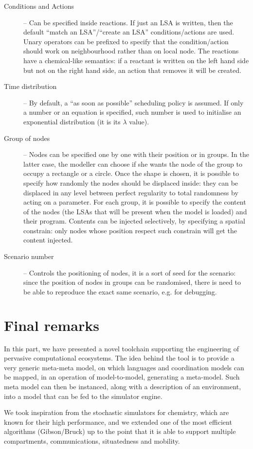 \documentclass[12pt,a4paper,twoside,openright]{book}
\begin{document}
\begin{description}
 \item[Conditions and Actions] -- Can be specified inside reactions. If just an LSA is written, then the default ``match an LSA''/``create an LSA'' conditions/actions are used. Unary operators can be prefixed to specify that the condition/action should work on neighbourhood rather than on local node. The reactions have a chemical-like semantics: if a reactant is written on the left hand side but not on the right hand side, an action that removes it will be created.
 \item[Time distribution] -- By default, a ``as soon as possible'' scheduling policy is assumed. If only a number or an equation is specified, such number is used to initialise an exponential distribution (it is its $\lambda{}$ value).
 \item [Group of nodes] -- Nodes can be specified one by one with their position or in groups. In the latter case, the modeller can choose if she wants the node of the group to occupy a rectangle or a circle. Once the shape is chosen, it is possible to specify how randomly the nodes should be displaced inside: they can be displaced in any level between perfect regularity to total randomness by acting on a parameter. For each group, it is possible to specify the content of the nodes (the LSAs that will be present when the model is loaded) and their program. Contents can be injected selectively, by specifying a spatial constrain: only nodes whose position respect such constrain will get the content injected.
 \item[Scenario number] -- Controls the positioning of nodes, it is a sort of seed for the scenario: since the position of nodes in groups can be randomised, there is need to be able to reproduce the exact same scenario, e.g. for debugging. 
\end{description}

\section{Final remarks}
In this part, we have presented a novel toolchain supporting the engineering of pervasive computational ecosystems.
%
The idea behind the tool is to provide a very generic meta-meta model, on which languages and coordination models can be mapped, in an operation of model-to-model, generating a meta-model.
%
Such meta model can then be instanced, along with a description of an environment, into a model that can be fed to the simulator engine.

We took inspiration from the stochastic simulators for chemistry, which are known for their high performance, and we extended one of the most efficient algorithms (Gibson/Bruck) up to the point that it is able to support multiple compartments, communications, situatedness and mobility.
\end{document}

